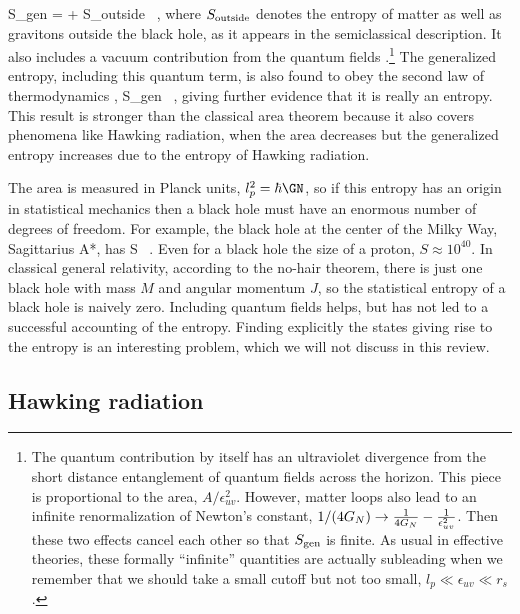 \be\label{sgen}
S_{\rm gen} =  + S_{\rm outside}  \ , \ee
where $S_{\rm outside}$ denotes the entropy of  matter  as well as gravitons outside the black hole, as it appears in the semiclassical description. It also includes a vacuum contribution from the quantum fields \cite{Bombelli:1986rw}.\footnote{  The quantum  contribution by itself has an ultraviolet divergence from the short distance entanglement of quantum fields across the horizon. This piece is proportional to the area, $A/\epsilon_{uv}^2$.  However, matter loops also lead to an infinite renormalization of Newton's constant, $1/(4 G_N) \to { 1 \over 4 G_N} - { 1 \over \epsilon^2_{uv}}$.  Then these two effects cancel each other so that $S_{\rm gen}$ is finite.   As usual in effective theories, these formally ``infinite'' quantities are actually subleading when we remember that we should take a small cutoff but not too small, $l_p \ll \epsilon_{uv} \ll r_s$. } 
The generalized entropy, including this quantum term, is also found to obey the second law of thermodynamics \cite{Wall:2011hj}, 
\be
\Delta S_{\rm gen}  \ ,
\ee
giving further evidence that it is really an entropy. This result is stronger than the classical area theorem because it also covers phenomena like Hawking radiation, when the area decreases but the generalized entropy increases due to the entropy of Hawking radiation. 

The area is measured in Planck units, $l_p^2 = \hbar \GN$, so if this entropy has an origin in statistical mechanics then a black hole must have an enormous number of degrees of freedom. For example, the black hole at the center of the Milky Way,   Sagittarius A*,  has
\be
S   \ .  
\ee
Even for a black hole the size of a proton, $S \approx 10^{40}$.
In classical general relativity, according to the no-hair theorem, there is just one black hole with mass $M$ and angular momentum $J$, so the statistical entropy of a black hole is naively zero. 
 Including quantum fields helps, but has not led to a successful accounting of the entropy. 
 Finding explicitly the states giving rise to the entropy is an interesting problem, which we will not discuss in this review. 


\subsection{Hawking radiation}


